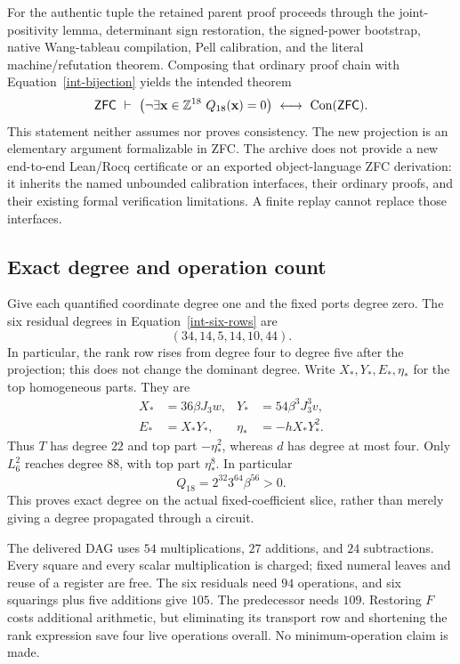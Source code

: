 For the authentic tuple the retained parent proof proceeds through the
joint-positivity lemma, determinant sign restoration, the signed-power
bootstrap, native Wang-tableau compilation, Pell calibration, and the
literal machine/refutation theorem.  Composing that ordinary proof chain
with Equation~\eqref{int-bijection} yields the intended theorem
\[
 \mathsf{ZFC}\ \vdash\
 \bigl(\neg\exists\mathbf x\in\mathbb Z^{18}\ Q_{18}(\mathbf x)=0\bigr)
       \ \longleftrightarrow\ \operatorname{Con}(\mathsf{ZFC}).
\]
This statement neither assumes nor proves consistency.  The new
projection is an elementary argument formalizable in ZFC.  The archive
does not provide a new end-to-end Lean/Rocq certificate or an exported
object-language ZFC derivation: it inherits the named unbounded
calibration interfaces, their ordinary proofs, and their existing formal
verification limitations.  A finite replay cannot replace those interfaces.

\subsection{Exact degree and operation count}
\label{int-degree}

Give each quantified coordinate degree one and the fixed ports degree
zero.  The six residual degrees in Equation~\eqref{int-six-rows} are
\[
 (34,14,5,14,10,44).
\]
In particular, the rank row rises from degree four to degree five after
the projection; this does not change the dominant degree.  Write
$X_*,Y_*,E_*,\eta_*$ for the top homogeneous parts.  They are
\begin{align*}
 X_*&=36\beta J_3w,&Y_*&=54\beta^3J_3^3v,\\
 E_*&=X_*Y_*,&\eta_*&=-hX_*Y_*^2.
\end{align*}
Thus $T$ has degree $22$ and top part $-\eta_*^2$, whereas $d$ has
degree at most four.  Only $L_6^2$ reaches degree $88$, with top part
$\eta_*^8$.  In particular
\begin{equation}
 [h^8w^8v^{16}J_3^{56}]Q_{18}
       =2^{32}3^{64}\beta^{56}>0.                    \label{int-top}
\end{equation}
This proves exact degree on the actual fixed-coefficient slice, rather
than merely giving a degree propagated through a circuit.

The delivered DAG uses $54$ multiplications, $27$ additions, and $24$
subtractions.  Every square and every scalar multiplication is charged;
fixed numeral leaves and reuse of a register are free.  The six residuals
need $94$ operations, and six squarings plus five additions give $105$.
The predecessor needs $109$.  Restoring $F$ costs additional arithmetic,
but eliminating its transport row and shortening the rank expression
save four live operations overall.  No minimum-operation claim is made.

